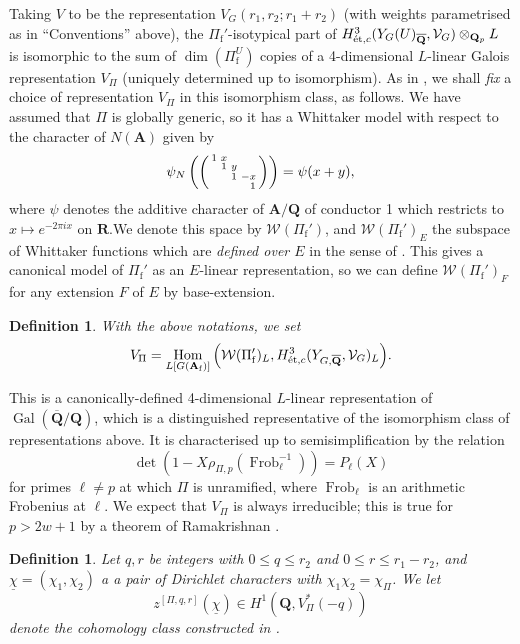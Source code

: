 \documentclass[cjm]{ipart}
\newenvironment{smatrix}{\left( \begin{smallmatrix} } {\end{smallmatrix} \right) }
\theoremstyle{plain}
\newtheorem{definition}[theorem]{Definition}
\theoremstyle{remark}
\DeclareMathOperator{\Gal}{Gal}
\DeclareMathOperator{\Hom}{Hom}
\newcommand{\Af}{\AA_{\mathrm{f}}}
\newcommand{\Pif}{\Pi_{\mathrm{f}}}
\newcommand{\QQbar}{\overline{\QQ}}
\newcommand{\QQ}{\mathbf{Q}}
\newcommand{\Qp}{\QQ_p}
\newcommand{\cV}{\mathcal{V}}
\newcommand{\cW}{\mathcal{W}}
\newcommand{\et}{\text{\textup{\'et}}}
\newcommand{\uchi}{\underline{\chi}}
\renewcommand{\AA}{\mathbf{A}}
\numberwithin{equation}{subsection}
\renewcommand{\le}{\leqslant}
\begin{document}
  Taking $V$ to be the representation $V_G(r_1, r_2; r_1 + r_2)$ (with weights parametrised as in ``Conventions'' above), the $\Pif'$-isotypical part of $H^3_{\et,c}(Y_G(U)_{\QQbar}, \cV_G) \otimes_{\Qp} L$ is isomorphic to the sum of $\dim\left( \Pif^U\right)$ copies of a 4-dimensional $L$-linear Galois representation $V_{\Pi}$ (uniquely determined up to isomorphism). As in \cite[\S 3.3]{LZ-equivar}, we shall \emph{fix} a choice of representation $V_{\Pi}$ in this isomorphism class, as follows. We have assumed that $\Pi$ is globally generic, so it has a Whittaker model with respect to the character of $N(\AA)$ given by
  \[ \psi_N\left(\begin{smatrix} 1 & x \\ & 1 & y \\ && 1 & -x \\ &&& \phantom{-}1 \end{smatrix}\right) = \psi(x + y),\]
  where $\psi$ denotes the additive character of $\AA / \QQ$ of conductor 1 which restricts to $x \mapsto e^{-2\pi i x}$ on $\mathbf{R}$.We denote this space by $\mathcal{W}(\Pif')$, and $\mathcal{W}(\Pif')_E$ the subspace of Whittaker functions which are \emph{defined over $E$} in the sense of \cite[Definition 10.2]{LPSZ1}. This gives a canonical model of $\Pif'$ as an $E$-linear representation, so we can define $\cW(\Pif')_F$ for any extension $F$ of $E$ by base-extension.

  \begin{definition}
   With the above notations, we set
   \[ V_\Pi = \Hom_{L[G(\Af)]}\Big(\mathcal{W}(\Pif')_L, H^3_{\et, c}( Y_{G, \QQbar}, \cV_G)_L \Big).\]
  \end{definition}

  This is a canonically-defined 4-dimensional $L$-linear representation of $\Gal(\QQbar/\QQ)$, which is a distinguished representative of the isomorphism class of representations above. It is characterised up to semisimplification by the relation
  \[ \det\left(1 - X \rho_{\Pi, p}(\operatorname{Frob}_\ell^{-1})\right) = P_\ell(X)\]
  for primes $\ell \ne p$ at which $\Pi$ is unramified, where $\operatorname{Frob}_\ell$ is an arithmetic Frobenius at $\ell$. We expect that $V_\Pi$ is always irreducible; this is true for $p > 2w + 1$ by a theorem of Ramakrishnan \cite{ramakrishnan13}.

  \begin{definition}
   \label{def:ESclass}
   Let $q, r$ be integers with $0 \le q \le r_2$ and $0 \le r \le r_1 - r_2$, and $\uchi = (\chi_1, \chi_2)$ a a pair of Dirichlet characters with $\chi_1\chi_2 = \chi_{\Pi}$. We let
   \[ z^{[\Pi, q, r]}(\uchi) \in H^1\left(\QQ, V_{\Pi}^*(-q)\right) \]
   denote the cohomology class constructed in \cite[Theorem A]{LZ-equivar}.
  \end{definition}
\end{document}
